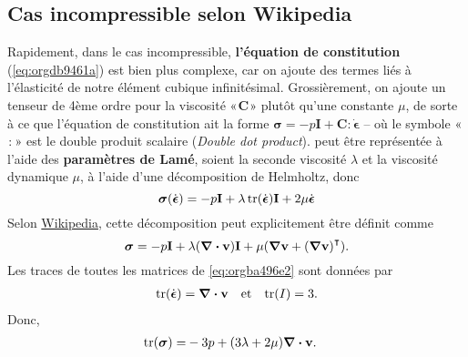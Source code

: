 \documentclass[10pt]{article}
\numberwithin{equation}{section}
\newcommand{\vv}{\vb{v}}
\newcommand{\pt}{\hspace{1pt}} %
\begin{document}
\subsection{Cas incompressible selon Wikipedia}
\label{sec:org59fb22c}
Rapidement, dans le cas incompressible, \textbf{l'équation de constitution} (\ref{eq:orgdb9461a}) est bien plus complexe, car on ajoute des termes liés à l'élasticité de notre élément cubique infinitésimal.
Grossièrement, on ajoute un tenseur de 4ème ordre pour la viscosité  «\(\pt\mathbf{C}\pt\)» plutôt qu'une constante \(\mu\), de sorte à ce que l'équation de constitution ait la forme \(\boldsymbol{\sigma}= - p\mathbf{I} + \mathbf{C}:\dot{\boldsymbol{\epsilon}}\) -- où le symbole «\(\pt:\pt\)» est le double produit scalaire (\emph{Double dot product}).
 peut être représentée à l'aide des \textbf{paramètres de Lamé}, soient la seconde viscosité \(\lambda\) et la viscosité dynamique \(\mu\), à l'aide d'une décomposition de Helmholtz, donc
\begin{equation}
   \boldsymbol{\sigma}(\dot{ \boldsymbol{\epsilon}} ) = -p\mathbf{I} + \lambda\trace(\dot{\boldsymbol{\epsilon}}) \mathbf{I} + 2\mu\dot{\boldsymbol{\epsilon}}
\end{equation}
Selon \href{https://en.wikipedia.org/wiki/Newtonian\_fluid\#Newtonian\_law\_of\_viscosity}{Wikipedia}, cette décomposition peut explicitement être définit comme
\begin{equation}
\label{eq:orgba496e2}
   \boldsymbol{\sigma} = -p\mathbf{I} + \lambda\qty(\divergence{\vv}) \mathbf{I} + \mu\qty(\gradient{\vv} + \qty(\gradient{\vv})^\intercal).
\end{equation}
Les traces de toutes les matrices de \ref{eq:orgba496e2} sont données par
\begin{align}
   &&\trace(\dot{\boldsymbol{\epsilon}}) = \divergence{\vv}
   && \text{et}
   &&\trace(I) = 3.&& 
\end{align}
Donc,
\begin{align}
   \trace(\boldsymbol{\sigma}) = &
    -3p + \qty(3\lambda + 2\mu)\divergence{\vv}.
\end{align}
\end{document}
